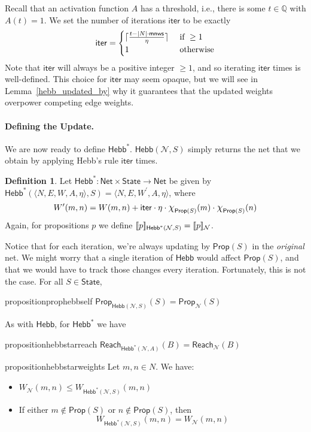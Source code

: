 \documentclass[letterpaper]{article}
\DeclarePairedDelimiter{\ceil}{\lceil}{\rceil}
\theoremstyle{definition}
\newtheorem{definition}{Definition}
\newcommand{\Rat}{\mathbb{Q}}
\newcommand{\State}{\mathsf{State}}
\newcommand{\semantics}[1]{[\![\mbox{\em $ #1 $\/}]\!]}
\newcommand*{\bigchi}{\mbox{\Large$\chi$}}%
\newcommand{\minscore}{\mathsf{mnws}}
\newcommand{\numiterations}{\mathsf{iter}}
\newcommand{\AllNets}{\mathsf{Net}}
\newcommand{\Net}{\mathcal{N}}
\newcommand{\Prop}{\mathsf{Prop}}
\newcommand{\Reach}{\mathsf{Reach}}
\newcommand{\Hebb}[2]{\mathsf{Hebb}(#1, #2)}
\newcommand{\HebbNoArgs}{\mathsf{Hebb}}
\newcommand{\Hebbstar}[2]{\mathsf{Hebb}^*(#1, #2)}
\newcommand{\HebbstarNoArgs}{\mathsf{Hebb}^*}
\begin{document}
Recall that an activation function $A$ has a threshold, i.e., there is some $t \in \Rat$ with $A(t) = 1$.  We set the number of iterations $\numiterations$ to be exactly
\[
    \numiterations = 
    \begin{cases}
        \ceil{\frac{t - |N| \cdot \minscore}{\eta}} & \mbox{ if } \geq 1\\
        1 & \mbox{ otherwise}
    \end{cases}
\]
Note that $\numiterations$ will always be a positive integer $\geq 1$, and so iterating $\numiterations$ times is well-defined.  This choice for $\numiterations$ may seem opaque, but we will see in Lemma~\ref{hebb_updated_by} why it guarantees that the updated weights overpower competing edge weights.
 
\paragraph*{Defining the Update.}
We are now ready to define $\HebbstarNoArgs$.  $\Hebb{\Net}{S}$ simply returns the net that we obtain by applying Hebb's rule $\numiterations$ times.
\begin{definition}
    Let $\HebbstarNoArgs : \AllNets \times \State \to \AllNets$ be given by $\Hebbstar{\langle N, E, W, A, \eta \rangle}{S} = \langle N, E, W^\prime, A, \eta \rangle$, where
    \[
        W^\prime(m, n) = W(m, n) + \numiterations \cdot \eta \cdot \bigchi_{\Prop(S)}(m) \cdot \bigchi_{\Prop(S)}(n)
    \]
    Again, for propositions $p$ we define $\semantics{p}_{\Hebbstar{\Net}{S}} = \semantics{p}_\Net$.
\end{definition}
Notice that for each iteration, we're always updating by $\Prop(S)$ in the \emph{original} net.  We might worry that a single iteration of $\HebbNoArgs$ would affect $\Prop(S)$, and that we would have to track those changes every iteration.  Fortunately, this is not the case.  For all $S \in \State$,
\begin{restatable}{proposition}{prophebbself}
    $\Prop_{\Hebb{\Net}{S}}(S) = \Prop_\Net(S)$
\end{restatable}

As with $\HebbNoArgs$, for $\HebbstarNoArgs$ we have
\begin{restatable}{proposition}{hebbstarreach}
    \label{hebbstar_reach}
    $\Reach_{\Hebbstar{\Net}{A}}(B) = \Reach_\Net(B)$
\end{restatable}
\begin{restatable}{proposition}{hebbstarweights}
    \label{hebbstar_weights}
    Let $m, n \in N$.  We have:
    \begin{itemize}
        \item $W_\Net(m, n) \leq W_{\Hebbstar{\Net}{S}}(m, n)$
        \item If either $m \not \in \Prop(S)$ or $n \not \in \Prop(S)$, then
        \[ W_{\Hebbstar{\Net}{S}}(m, n) = W_\Net(m, n) \]
    \end{itemize}
\end{restatable}
\end{document}

